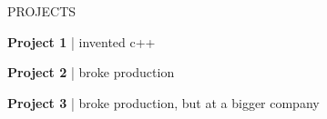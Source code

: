 \begin{rSection}{PROJECTS}
\vspace{-1.25em}
\item \textbf{Project 1} | {invented c++}
\item \textbf{Project 2} | {broke production}
\item \textbf{Project 3} | {broke production, but at a bigger company}
\end{rSection} 